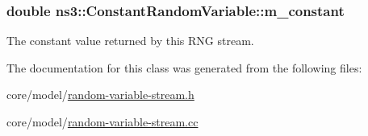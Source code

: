 \subsubsection[{\texorpdfstring{m\+\_\+constant}{m_constant}}]{\setlength{\rightskip}{0pt plus 5cm}double ns3\+::\+Constant\+Random\+Variable\+::m\+\_\+constant\hspace{0.3cm}{\ttfamily [private]}}\hypertarget{classns3_1_1ConstantRandomVariable_a88375ad059af903c5e7fde63b7910dae}{}\label{classns3_1_1ConstantRandomVariable_a88375ad059af903c5e7fde63b7910dae}
The constant value returned by this R\+NG stream. 

The documentation for this class was generated from the following files\+:\begin{DoxyCompactItemize}
\item 
core/model/\hyperlink{random-variable-stream_8h}{random-\/variable-\/stream.\+h}\item 
core/model/\hyperlink{random-variable-stream_8cc}{random-\/variable-\/stream.\+cc}\end{DoxyCompactItemize}
